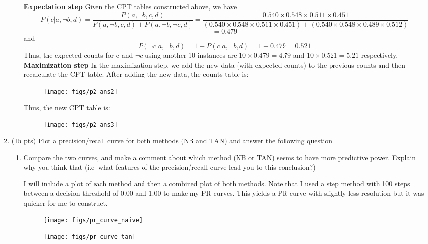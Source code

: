 \documentclass{article}
\newenvironment{soln}{
	\leavevmode\color{blue}\ignorespaces
}{}
\begin{document}
\begin{enumerate}
\begin{enumerate}
\begin{soln}
\textbf{Expectation step}
Given the CPT tables constructed above, we have 
\[P(c | a, \neg b, d) = \frac{P(a,\neg b, c, d)}{P(a,\neg b, c, d) + P(a,\neg b, \neg c, d)} = \frac{0.540\times0.548\times0.511\times0.451}{(0.540\times0.548\times0.511\times0.451) + (0.540\times0.548\times0.489\times0.512)}\]\[= 0.479\]
and
\[P(\neg c | a, \neg b, d) = 1 - P(c | a, \neg b, d) = 1 - 0.479 = 0.521\]
Thus, the expected counts for c and $\neg c$ using another 10 instances are $10\times0.479 = 4.79$ and $10\times 0.521 = 5.21$ respectively. \\

\textbf{Maximization step}
In the maximization step, we add the new data (with expected counts) to the previous counts and then recalculate the CPT table.
After adding the new data, the counts table is:
\begin{figure}[h]
\centering
\texttt{[image: figs/p2\_ans2]}
\label{fig:q2_ans2}
\end{figure}

\pagebreak
Thus, the new CPT table is:
\begin{figure}[h]
\centering
\texttt{[image: figs/p2\_ans3]}
\label{fig:q2_ans3}
\end{figure}

\end{soln}


\end{enumerate}

\item  (15 pts) Plot a precision/recall curve for both methods (NB and TAN) and answer the following question:
\begin{enumerate}
\item Compare the two curves, and make a comment about which method (NB or TAN) seems to have more predictive power. Explain why you think that (i.e. what features of the precision/recall curve lead you to this conclusion?) \\ 
\begin{soln}
I will include a plot of each method and then a combined plot of both methods. Note that I used a step method with 100 steps between a decision threshold of 0.00 and 1.00 to make my PR curves. This yields a PR-curve with slightly less resolution but it was quicker for me to construct.
\begin{figure}[H]
\centering
\texttt{[image: figs/pr\_curve\_naive]}
\label{fig:pr_curve_naive}

\centering
\texttt{[image: figs/pr\_curve\_tan]}
\label{fig:pr_curve_tan}


\end{figure}
\end{soln}
\end{enumerate}
\end{enumerate}
\end{document}
